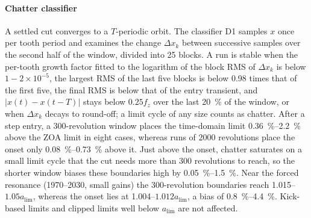 \paragraph{Chatter classifier}
A settled cut converges to a $T$-periodic orbit. The classifier D1 samples $x$ once per tooth period and examines the change $\Delta x_k$ between successive samples over the second half of the window, divided into 25 blocks. A run is stable when the per-tooth growth factor fitted to the logarithm of the block RMS of $\Delta x_k$ is below $1-2\times10^{-5}$, the largest RMS of the last five blocks is below 0.98 times that of the first five, the final RMS is below that of the entry transient, and $\lvert x(t)-x(t-T)\rvert$ stays below $0.25f_z$ over the last \SI{20}{\percent} of the window, or when $\Delta x_k$ decays to round-off; a limit cycle of any size counts as chatter. After a step entry, a 300-revolution window places the time-domain limit \SIrange{0.36}{2.2}{\percent} above the ZOA limit in eight cases, whereas runs of 2000 revolutions place the onset only \SIrange{0.08}{0.73}{\percent} above it. Just above the onset, chatter saturates on a small limit cycle that the cut needs more than 300 revolutions to reach, so the shorter window biases these boundaries high by \SIrange{0.05}{1.5}{\percent}. Near the forced resonance (\SIrange{1970}{2030}{\rpm}, small gains) the 300-revolution boundaries reach 1.015--$1.05a_{\lim}$, whereas the onset lies at 1.004--$1.012a_{\lim}$, a bias of \SIrange{0.8}{4.4}{\percent}. Kick-based limits and clipped limits well below $a_{\lim}$ are not affected.
